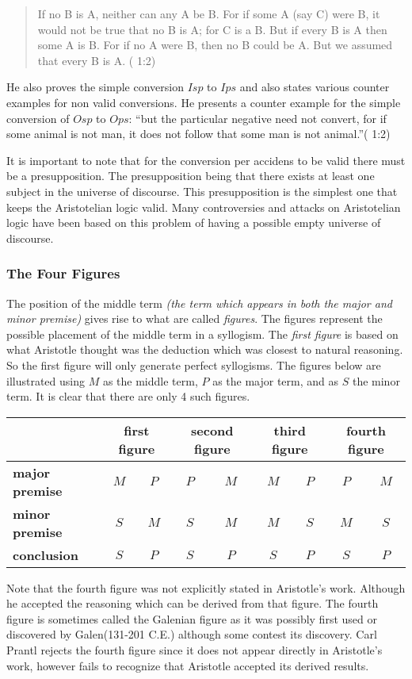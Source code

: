 \documentclass[12pt]{article}
\begin{document}
\begin{quote}
If no B is A, neither can any A be B. For if some A (say C) were B, it would not be true that no B is A; for C is a B. But if every B is A then some A is B. For if no A were B, then no B could be A. But we assumed that every B is A. (\cite{AP} 1:2)
\end{quote}
He also proves the simple conversion $Isp$ to $Ips$ and also states various counter examples for non valid conversions.  He presents a counter example for the simple conversion of $Osp$ to $Ops$: ``but the particular negative need not convert, for if some animal is not man, it does not follow that some man is not animal.''(\cite{AP} 1:2)

It is important to note that for the conversion per accidens to be valid there must be a presupposition.  The presupposition being that there exists at least one subject in the universe of discourse.  This presupposition is the simplest one that keeps the Aristotelian logic valid.  Many controversies and attacks on Aristotelian logic have been based on this problem of having a possible empty universe of discourse. 

\subsubsection*{The Four Figures}
The position of the middle term \textit{(the term which appears in both the major and minor premise)} gives rise to what are called \emph{figures}.  The figures represent the possible placement of the middle term in a syllogism.  The \emph{first figure} is based on what Aristotle thought was the deduction which was closest to natural reasoning.  So the first figure will only generate perfect syllogisms.  The figures below are illustrated using $M$ as the middle term, $P$ as the major term, and as $S$ the minor term.  It is clear that there are only 4 such figures. 
\begin{center}
\begin{tabular}{l| c c | c c | c c | c c}
& \multicolumn{2}{c}{\textbf{first figure}} & \multicolumn{2}{c}{\textbf{second figure}} & \multicolumn{2}{c}{\textbf{third figure}} & \multicolumn{2}{c}{\textbf{fourth figure}}\\
\hline
\textbf{major premise} & $M$ & $P$ & $P$ & $M$ & $M$ & $P$  & $P$ & $M$\\
\textbf{minor premise} & $S$ & $M$ & $S$ & $M$ & $M$ & $S$  & $M$ & $S$\\
\textbf{conclusion} & $S$ & $P$ & $S$ & $P$ & $S$ & $P$  & $S$ & $P$\\
\end{tabular}
\end{center}
Note that the fourth figure was not explicitly stated in Aristotle's work.  Although he accepted the reasoning which can be derived from that figure.  The fourth figure is sometimes called the Galenian figure as it was possibly first used or discovered by Galen(131-201 C.E.) although some contest its discovery.\cite{LJ}  Carl Prantl rejects the fourth figure since it does not appear directly in Aristotle's work, however fails to recognize that Aristotle accepted its derived results.\cite{LJ}    
\end{document}
